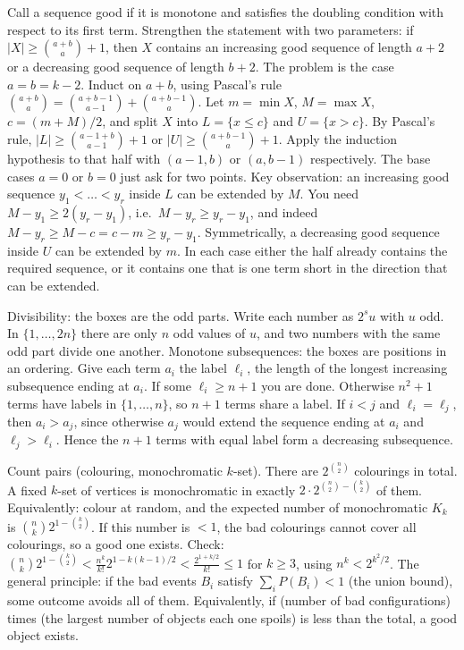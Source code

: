 \documentclass[11pt,a4paper]{article}
\begin{document}
 Call a sequence good if it is monotone and satisfies the doubling condition with respect to its first term. Strengthen the statement with two parameters: if $|X|\ge\binom{a+b}{a}+1$, then $X$ contains an increasing good sequence of length $a+2$ or a decreasing good sequence of length $b+2$. The problem is the case $a=b=k-2$. Induct on $a+b$, using Pascal's rule $\binom{a+b}{a}=\binom{a+b-1}{a-1}+\binom{a+b-1}{a}$.
 Let $m=\min X$, $M=\max X$, $c=(m+M)/2$, and split $X$ into $L=\{x\le c\}$ and $U=\{x>c\}$. By Pascal's rule, $|L|\ge\binom{a-1+b}{a-1}+1$ or $|U|\ge\binom{a+b-1}{a}+1$. Apply the induction hypothesis to that half with $(a-1,b)$ or $(a,b-1)$ respectively. The base cases $a=0$ or $b=0$ just ask for two points.
 Key observation: an increasing good sequence $y_1<\dots<y_r$ inside $L$ can be extended by $M$. You need $M-y_1\ge 2(y_r-y_1)$, i.e.\ $M-y_r\ge y_r-y_1$, and indeed $M-y_r\ge M-c=c-m\ge y_r-y_1$. Symmetrically, a decreasing good sequence inside $U$ can be extended by $m$. In each case either the half already contains the required sequence, or it contains one that is one term short in the direction that can be extended.

 Divisibility: the boxes are the odd parts. Write each number as $2^{s}u$ with $u$ odd. In $\{1,\dots,2n\}$ there are only $n$ odd values of $u$, and two numbers with the same odd part divide one another.
 Monotone subsequences: the boxes are positions in an ordering. Give each term $a_i$ the label $\ell_i$, the length of the longest increasing subsequence ending at $a_i$. If some $\ell_i\ge n+1$ you are done. Otherwise $n^2+1$ terms have labels in $\{1,\dots,n\}$, so $n+1$ terms share a label.
 If $i<j$ and $\ell_i=\ell_j$, then $a_i>a_j$, since otherwise $a_j$ would extend the sequence ending at $a_i$ and $\ell_j>\ell_i$. Hence the $n+1$ terms with equal label form a decreasing subsequence.

 Count pairs (colouring, monochromatic $k$-set). There are $2^{\binom n2}$ colourings in total. A fixed $k$-set of vertices is monochromatic in exactly $2\cdot 2^{\binom n2-\binom k2}$ of them. Equivalently: colour at random, and the expected number of monochromatic $K_k$ is $\binom nk 2^{1-\binom k2}$.
 If this number is $<1$, the bad colourings cannot cover all colourings, so a good one exists. Check: $\binom nk 2^{1-\binom k2}<\frac{n^k}{k!}2^{1-k(k-1)/2}<\frac{2^{1+k/2}}{k!}\le 1$ for $k\ge 3$, using $n^k<2^{k^2/2}$.
 The general principle: if the bad events $B_i$ satisfy $\sum_i P(B_i)<1$ (the union bound), some outcome avoids all of them. Equivalently, if (number of bad configurations) times (the largest number of objects each one spoils) is less than the total, a good object exists.
\end{document}
